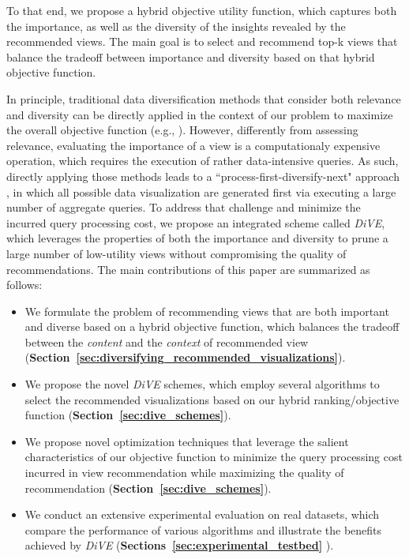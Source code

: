To that end, we propose a hybrid objective utility function, which captures both the importance, as well as the diversity of the insights revealed by the recommended views.
%
The main goal is to select and recommend top-k views that balance the tradeoff between importance and diversity based on that hybrid objective function. 
%

In principle, traditional data diversification methods that consider both relevance and diversity can be directly applied in the context of our problem to maximize the overall objective function (e.g., \cite{Zhang2008,Rafiei2010,Yu2009}).
%
%
However, differently from assessing  relevance, evaluating the importance of a view is a computationaly expensive operation, which requires the execution of rather data-intensive queries. 
%
As such, directly applying those methods leads to a ``process-first-diversify-next" approach \cite{Zhang2008,Rafiei2010}, in which all possible data visualization are generated first via executing a large number of aggregate queries. 
%
To address that challenge and minimize the incurred query processing cost, we propose an integrated scheme called {\em DiVE}, which leverages the properties of both the importance and diversity to prune a large number of low-utility views without compromising the quality of recommendations. 
%
The main contributions of this paper are summarized as follows:

\setlength{\leftmargini}{6pt}
\begin{itemize}

	\item We formulate the problem of recommending views that are both important and diverse based on a hybrid objective function, which balances the tradeoff between the {\em content} and the {\em context} of recommended view ({\bf Section~\ref{sec:diversifying_recommended_visualizations}}). 
		
	\item We propose the novel \textit{DiVE} schemes, which employ several algorithms to select the recommended visualizations based on our hybrid ranking/objective function ({\bf Section~\ref{sec:dive_schemes}}).
	
	\item We propose novel optimization techniques that leverage the salient characteristics of our objective function to minimize the query processing cost incurred in view recommendation while maximizing the quality of recommendation ({\bf Section~\ref{sec:dive_schemes}}).
	
	\item We conduct an extensive experimental evaluation on real datasets, which compare the performance of various algorithms and illustrate the benefits achieved by \textit{DiVE} ({\bf Sections~\ref{sec:experimental_testbed} }). 
\end{itemize}


